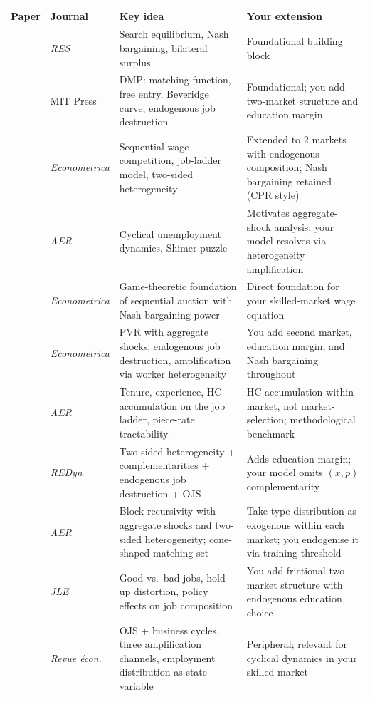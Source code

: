 \documentclass[12pt]{article}
\begin{document}
\begin{longtable}{p{3.5cm} p{2.8cm} p{4cm} p{3.5cm}}
\toprule
\textbf{Paper} & \textbf{Journal} & \textbf{Key idea} & \textbf{Your extension} \\
\midrule
\endhead
\citet{diamond1982} & \emph{RES} & Search equilibrium, Nash bargaining, bilateral surplus & Foundational building block \\[6pt]
\citet{Pissarides2000} & MIT Press & DMP: matching function, free entry, Beveridge curve, endogenous job destruction & Foundational; you add two-market structure and education margin \\[6pt]
\citet{postelvinary2002} & \emph{Econometrica} & Sequential wage competition, job-ladder model, two-sided heterogeneity & Extended to 2 markets with endogenous composition; Nash bargaining retained (CPR style) \\[6pt]
\citet{shimer2005} & \emph{AER} & Cyclical unemployment dynamics, Shimer puzzle & Motivates aggregate-shock analysis; your model resolves via heterogeneity amplification \\[6pt]
\citet{cahuc2006} & \emph{Econometrica} & Game-theoretic foundation of sequential auction with Nash bargaining power & Direct foundation for your skilled-market wage equation \\[6pt]
\citet{robin2011} & \emph{Econometrica} & PVR with aggregate shocks, endogenous job destruction, amplification via worker heterogeneity & You add second market, education margin, and Nash bargaining throughout \\[6pt]
\citet{bagger2014} & \emph{AER} & Tenure, experience, HC accumulation on the job ladder, piece-rate tractability & HC accumulation within market, not market-selection; methodological benchmark \\[6pt]
\citet{lise2016} & \emph{REDyn} & Two-sided heterogeneity + complementarities + endogenous job destruction + OJS & Adds education margin; your model omits $(x,p)$ complementarity \\[6pt]
\citet{lise2017} & \emph{AER} & Block-recursivity with aggregate shocks and two-sided heterogeneity; cone-shaped matching set & Take type distribution as exogenous within each market; you endogenise it via training threshold \\[6pt]
\citet{acemoglu2001} & \emph{JLE} & Good vs.\ bad jobs, hold-up distortion, policy effects on job composition & You add frictional two-market structure with endogenous education choice \\[6pt]
\citet{moscarini2024} & \emph{Revue écon.} & OJS + business cycles, three amplification channels, employment distribution as state variable & Peripheral; relevant for cyclical dynamics in your skilled market \\
\bottomrule
\end{longtable}
\end{document}
